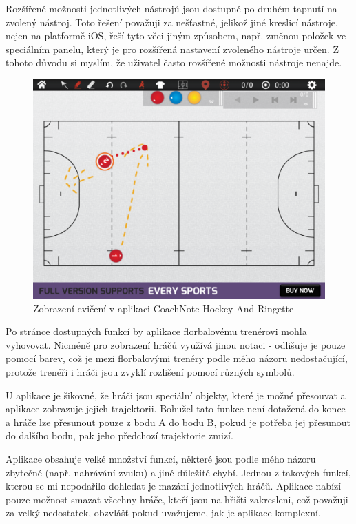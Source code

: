 \documentclass[thesis=B,czech]{FITthesis}[2012/06/26]
\begin{document}
	Rozšířené možnosti jednotlivých nástrojů jsou dostupné po druhém tapnutí na zvolený nástroj. Toto řešení považuji za nešťastné, jelikož jiné kreslicí nástroje, nejen na platformě iOS, řeší tyto věci jiným způsobem, např. změnou položek ve speciálním panelu, který je pro rozšířená nastavení zvoleného nástroje určen. Z tohoto důvodu si myslím, že uživatel často rozšířené možnosti nástroje nenajde.

	\begin{figure}[h!]
		\centering
		\includegraphics[width=\textwidth]{img/competition/coachnote/IMG_0011}
		\caption{Zobrazení cvičení v aplikaci CoachNote Hockey And Ringette}
		\label{pic:coachnote_exercises}
	\end{figure}

	Po stránce dostupných funkcí by aplikace florbalovému trenérovi mohla vyhovovat. Nicméně pro zobrazení hráčů využívá jinou notaci \-- odlišuje je pouze pomocí barev, což je mezi florbalovými trenéry podle mého názoru nedostačující, protože trenéři i hráči jsou zvyklí rozlišení pomocí různých symbolů.

	U aplikace je šikovné, že hráči jsou speciální objekty, které je možné přesouvat a aplikace zobrazuje jejich trajektorii. Bohužel tato funkce není dotažená do konce a hráče lze přesunout pouze z bodu A do bodu B, pokud je potřeba jej přesunout do dalšího bodu, pak jeho předchozí trajektorie zmizí.

	Aplikace obsahuje velké množství funkcí, některé jsou podle mého názoru zbytečné (např. nahrávání zvuku) a jiné důležité chybí. Jednou z takových funkcí, kterou se mi nepodařilo dohledat je mazání jednotlivých hráčů. Aplikace nabízí pouze možnost smazat všechny hráče, kteří jsou na hřišti zakresleni, což považuji za velký nedostatek, obzvlášť pokud uvažujeme, jak je aplikace komplexní.
\end{document}
